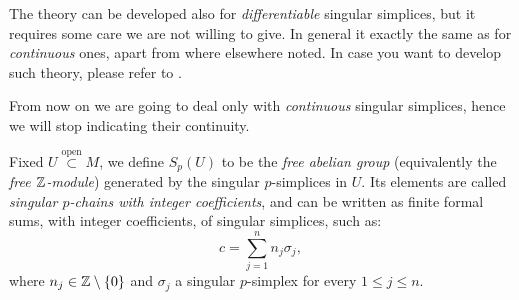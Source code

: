 \begin{rem}
	The theory can be developed also for \textit{differentiable} singular simplices, but it requires some care we are not willing to give.
	In general it exactly the same as for \textit{continuous} ones, apart from where elsewhere noted.
	In case you want to develop such theory, please refer to \cite{warner}.

	From now on we are going to deal only with \textit{continuous} singular simplices, hence we will stop indicating their continuity.
\end{rem}

\begin{defn}
Fixed $U \stackrel{\text{open}}{\subset} M$, we define $S_p(U)$ to be the \textit{free abelian group} (equivalently the \textit{free $\mathbb{Z}$-module}) generated by the singular $p$-simplices in $U$.
	Its elements are called \textit{singular $p$-chains with integer coefficients}, and can be written as finite formal sums, with integer coefficients, of singular simplices, such as:
	\begin{equation}
	c = \sum_{j=1}^{n} n_j \sigma_j
	,\end{equation} 
	where $n_j \in \mathbb{Z}\setminus \left\{ 0 \right\}$ and $\sigma_j$ a singular $p$-simplex for every $1 \leq j \leq n$.
\end{defn}


